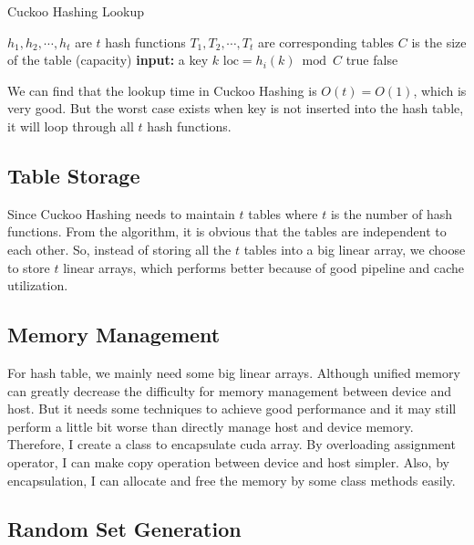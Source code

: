 \documentclass[10pt,twocolumn,letterpaper]{article}
\begin{document}
\begin{algorithm}
    \caption{Cuckoo Hashing Lookup}
    \label{basic_lookup}
    \begin{algorithmic}
        \STATE $h_1, h_2, \cdots, h_t$ are $t$ hash functions
	    \STATE $T_1, T_2, \cdots, T_t$ are corresponding tables
	    \STATE $C$ is the size of the table (capacity)
	    \STATE \textbf{input:} a key $k$
	        \STATE $\text{loc} = h_i(k) \bmod C$
	            \RETURN true
	        \ENDIF
	    \ENDFOR
	    \RETURN false
    \end{algorithmic}
\end{algorithm}

We can find that the lookup time in Cuckoo Hashing is $O(t) = O(1)$, which is very good. But the worst case exists when key is not inserted into the hash table, it will loop through all $t$ hash functions.

\subsection{Table Storage}

Since Cuckoo Hashing needs to maintain $t$ tables where $t$ is the number of hash functions. From the algorithm, it is obvious that the tables are independent to each other. So, instead of storing all the $t$ tables into a big linear array, we choose to store $t$ linear arrays, which performs better because of good pipeline and cache utilization.

\subsection{Memory Management}

For hash table, we mainly need some big linear arrays. Although unified memory can greatly decrease the difficulty for memory management between device and host. But it needs some techniques to achieve good performance and it may still perform a little bit worse than directly manage host and device memory. Therefore, I create a class to encapsulate cuda array. By overloading assignment operator, I can make copy operation between device and host simpler. Also, by encapsulation, I can allocate and free the memory by some class methods easily. 

\subsection{Random Set Generation}
\end{document}
